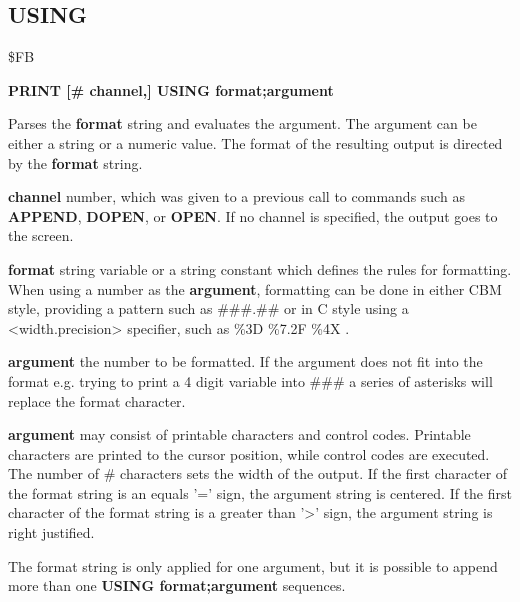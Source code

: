 \subsection{USING}
\begin{description}[leftmargin=2cm,style=nextline]
\item [Token:] \$FB
\item [Format:] {\bf PRINT [\# channel,] USING format;argument}
\item [Usage:]  Parses the {\bf format} string and evaluates the argument.
                The argument can be either a string or a numeric value.
                The format of the resulting output is directed
                by the {\bf format} string.

                {\bf channel} number, which was given to a previous
                call to commands such as {\bf APPEND}, {\bf DOPEN}, or {\bf OPEN}.
                If no channel is specified, the output goes to the screen.

                {\bf format} string variable or a string constant
                which defines the rules for formatting.
                When using a number as the {\bf argument}, formatting can be done in either
                CBM style, providing a pattern such as {\ttfamily \#\#\#.\#\#}
                or in C style using a <width.precision> specifier, such as {\ttfamily \%3D \%7.2F \%4X }.

                {\bf argument} the number to be formatted. If the argument does not fit into the format
                e.g. trying to print a 4 digit variable into {\ttfamily \#\#\#}
                a series of asterisks will replace the format character.

                {\bf argument} may consist of printable
                characters and control codes. Printable characters
                are printed to the cursor position, while control
                codes are executed.
                The number of {\ttfamily \#} characters sets the width of the output.
                If the first character of the format string
                is an equals '=' sign, the argument string is centered.
                If the first character of the format string
                is a greater than '>' sign, the argument string is right justified.

\item [Remarks:] The format string is only applied for one argument,
                 but it is possible to append more than one
                 {\bf USING format;argument} sequences.



\end{description}
